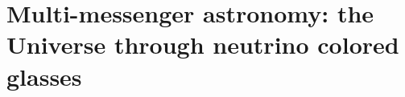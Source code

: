 \chapter{Multi-messenger astronomy: the Universe through neutrino colored glasses}
\label{chapter:public}